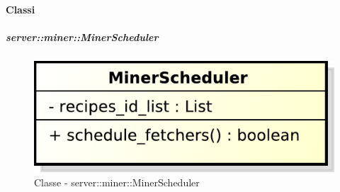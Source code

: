 \paragraph{Classi} %
		\subparagraph{server::miner::MinerScheduler} %
		\label{subp:server_miner_MinerScheduler}
		    \begin{figure}[!htbp]
 		 		\centering
 				\centerline{\includegraphics[scale=0.75]{./images/server/classes/miner/miner_scheduler.pdf}}
 				\caption{Classe - server::miner::MinerScheduler}
			\end{figure}

